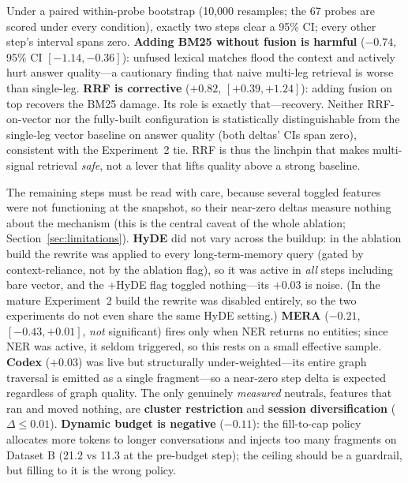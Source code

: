 \documentclass[10pt]{article}
\begin{document}
Under a paired within-probe bootstrap (10{,}000 resamples; the 67 probes are scored under every condition), exactly two steps clear a 95\% CI; every other step's interval spans zero. \textbf{Adding BM25 without fusion is harmful} ($-0.74$, 95\% CI $[-1.14,-0.36]$): unfused lexical matches flood the context and actively hurt answer quality---a cautionary finding that naive multi-leg retrieval is worse than single-leg. \textbf{RRF is corrective} ($+0.82$, $[+0.39,+1.24]$): adding fusion on top recovers the BM25 damage. Its role is exactly that---recovery. Neither RRF-on-vector nor the fully-built configuration is statistically distinguishable from the single-leg vector baseline on answer quality (both deltas' CIs span zero), consistent with the Experiment~2 tie. RRF is thus the linchpin that makes multi-signal retrieval \emph{safe}, not a lever that lifts quality above a strong baseline.

The remaining steps must be read with care, because several toggled features were not functioning at the snapshot, so their near-zero deltas measure nothing about the mechanism (this is the central caveat of the whole ablation; Section~\ref{sec:limitations}). \textbf{HyDE} did not vary across the buildup: in the ablation build the rewrite was applied to every long-term-memory query (gated by context-reliance, not by the ablation flag), so it was active in \emph{all} steps including bare vector, and the $+$HyDE flag toggled nothing---its $+0.03$ is noise. (In the mature Experiment~2 build the rewrite was disabled entirely, so the two experiments do not even share the same HyDE setting.) \textbf{MERA} ($-0.21$, $[-0.43,+0.01]$, \emph{not} significant) fires only when NER returns no entities; since NER was active, it seldom triggered, so this rests on a small effective sample. \textbf{Codex} ($+0.03$) was live but structurally under-weighted---its entire graph traversal is emitted as a single fragment---so a near-zero step delta is expected regardless of graph quality. The only genuinely \emph{measured} neutrals, features that ran and moved nothing, are \textbf{cluster restriction} and \textbf{session diversification} ($\Delta \leq 0.01$). \textbf{Dynamic budget is negative} ($-0.11$): the fill-to-cap policy allocates more tokens to longer conversations and injects too many fragments on Dataset B (21.2 vs 11.3 at the pre-budget step); the ceiling should be a guardrail, but filling to it is the wrong policy.
\end{document}
